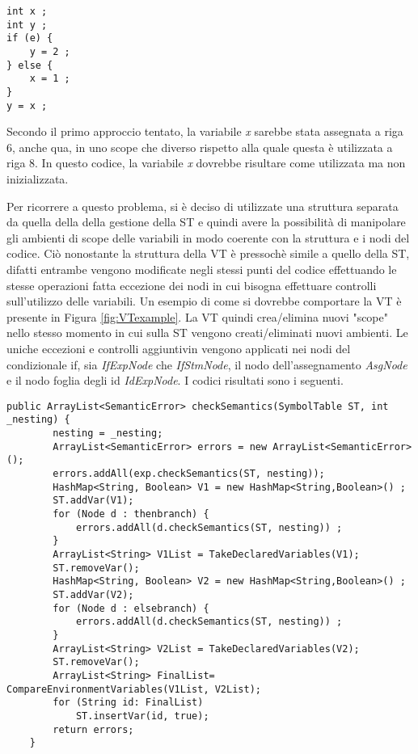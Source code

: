 \begin{verbatim}
int x ; 
int y ;
if (e) {
    y = 2 ;
} else {
    x = 1 ;
}
y = x ;
\end{verbatim}
Secondo il primo approccio tentato, la variabile \textit{x} sarebbe stata assegnata a riga 6, anche qua, in uno scope che diverso rispetto alla quale questa è utilizzata a riga 8. In questo codice, la variabile \textit{x} dovrebbe risultare come utilizzata ma non inizializzata.

Per ricorrere a questo problema, si è deciso di utilizzate una struttura separata da quella della della gestione della ST e quindi avere la possibilità di manipolare gli ambienti di scope delle variabili in modo coerente con la struttura e i nodi del codice. Ciò nonostante la struttura della VT è pressochè simile a quello della ST, difatti entrambe vengono modificate negli stessi punti del codice effettuando le stesse operazioni fatta eccezione dei nodi in cui bisogna effettuare controlli sull'utilizzo delle variabili. Un esempio di come si dovrebbe comportare la VT è presente in Figura \ref{fig:VTexample}. La VT quindi crea/elimina nuovi "scope" nello stesso momento in cui sulla ST vengono creati/eliminati nuovi ambienti. Le uniche eccezioni e controlli aggiuntivin vengono applicati nei nodi del condizionale if, sia \textit{IfExpNode} che \textit{IfStmNode}, il nodo dell'assegnamento \textit{AsgNode} e il nodo foglia degli id \textit{IdExpNode}. I codici risultati sono i seguenti.
\begin{verbatim}
public ArrayList<SemanticError> checkSemantics(SymbolTable ST, int _nesting) {
        nesting = _nesting;
        ArrayList<SemanticError> errors = new ArrayList<SemanticError>();
        errors.addAll(exp.checkSemantics(ST, nesting));
        HashMap<String, Boolean> V1 = new HashMap<String,Boolean>() ;
        ST.addVar(V1);
        for (Node d : thenbranch) {
            errors.addAll(d.checkSemantics(ST, nesting)) ;
        }
        ArrayList<String> V1List = TakeDeclaredVariables(V1);
        ST.removeVar();
        HashMap<String, Boolean> V2 = new HashMap<String,Boolean>() ;
        ST.addVar(V2);
        for (Node d : elsebranch) {
            errors.addAll(d.checkSemantics(ST, nesting)) ;
        }
        ArrayList<String> V2List = TakeDeclaredVariables(V2);
        ST.removeVar();
        ArrayList<String> FinalList= CompareEnvironmentVariables(V1List, V2List);
        for (String id: FinalList)
            ST.insertVar(id, true);
        return errors;
    }
\end{verbatim}
